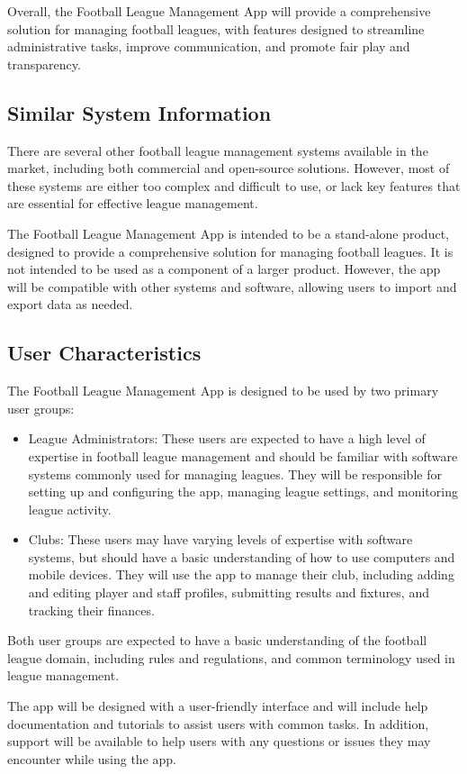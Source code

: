 \documentclass[12pt]{article}
\begin{document}
Overall, the Football League Management App will provide a comprehensive solution for managing football leagues, with features designed to streamline administrative tasks, improve communication, and promote fair play and transparency.
\subsection{Similar System Information}
There are several other football league management systems available in the market, including both commercial and open-source solutions. However, most of these systems are either too complex and difficult to use, or lack key features that are essential for effective league management.

The Football League Management App is intended to be a stand-alone product, designed to provide a comprehensive solution for managing football leagues. It is not intended to be used as a component of a larger product. However, the app will be compatible with other systems and software, allowing users to import and export data as needed.
\subsection{ User Characteristics}
The Football League Management App is designed to be used by two primary user groups:
\begin{itemize}
    \item League Administrators: These users are expected to have a high level of expertise in football league management and should be familiar with software systems commonly used for managing leagues. They will be responsible for setting up and configuring the app, managing league settings, and monitoring league activity.

    \item Clubs: These users may have varying levels of expertise with software systems, but should have a basic understanding of how to use computers and mobile devices. They will use the app to manage their club, including adding and editing player and staff profiles, submitting results and fixtures, and tracking their finances.
\end{itemize}
Both user groups are expected to have a basic understanding of the football league domain, including rules and regulations, and common terminology used in league management.

The app will be designed with a user-friendly interface and will include help documentation and tutorials to assist users with common tasks. In addition, support will be available to help users with any questions or issues they may encounter while using the app.
\end{document}
